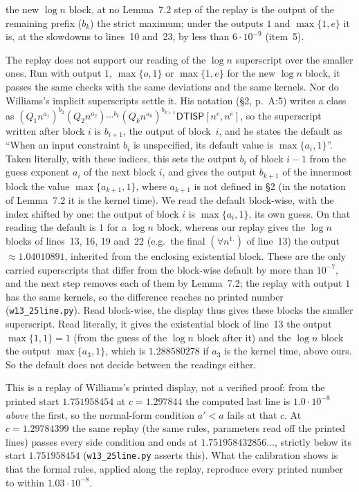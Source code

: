 \documentclass[11pt]{article}
\theoremstyle{definition}
\newcommand{\DTISP}{\mathsf{DTISP}}
\begin{document}
the new $\log n$ block, at no Lemma~7.2 step of the replay is the output of the remaining prefix ($b_k$) the strict maximum; under the outputs $1$ and $\max\{1,e\}$ it is, at the slowdowns to lines~10 and~23, by less than $6\cdot10^{-9}$ (item~5).

The replay does not support our reading of the $\log n$ superscript over the smaller ones. Run with output $1$, $\max\{o,1\}$ or $\max\{1,e\}$ for the new $\log n$ block, it passes the same checks with the same deviations and the same kernels. Nor do Williams's implicit superscripts settle it. His notation (\S2, p.~A:5) writes a class as $(Q_1n^{a_1})^{b_2}(Q_2n^{a_2})\cdots{}^{b_k}(Q_kn^{a_k})^{b_{k+1}}\DTISP[n^c,n^e]$, so the superscript written after block $i$ is $b_{i+1}$, the output of block~$i$, and he states the default as ``When an input constraint $b_i$ is unspecified, its default value is $\max\{a_i,1\}$''. Taken literally, with these indices, this sets the output $b_i$ of block $i-1$ from the guess exponent $a_i$ of the next block $i$, and gives the output $b_{k+1}$ of the innermost block the value $\max\{a_{k+1},1\}$, where $a_{k+1}$ is not defined in \S2 (in the notation of Lemma~7.2 it is the kernel time). We read the default block-wise, with the index shifted by one: the output of block $i$ is $\max\{a_i,1\}$, its own guess. On that reading the default is $1$ for a $\log n$ block, whereas our replay gives the $\log n$ blocks of lines~13, 16, 19 and~22 (e.g.\ the final $(\forall n^{1.})$ of line~13) the output $\approx1.04010891$, inherited from the enclosing existential block. These are the only carried superscripts that differ from the block-wise default by more than $10^{-7}$, and the next step removes each of them by Lemma~7.2; the replay with output $1$ has the same kernels, so the difference reaches no printed number (\texttt{w13\_25line.py}). Read block-wise, the display thus gives these blocks the smaller superscript. Read literally, it gives the existential block of line~13 the output $\max\{1,1\}=1$ (from the guess of the $\log n$ block after it) and the $\log n$ block the output $\max\{a_3,1\}$, which is $1.288580278$ if $a_3$ is the kernel time, above ours. So the default does not decide between the readings either.

This is a replay of Williams's printed display, not a verified proof: from the printed start $1.751958454$ at $c=1.297844$ the computed last line is $1.0\cdot10^{-8}$ \emph{above} the first, so the normal-form condition $a'<a$ fails at that $c$. At $c=1.29784399$ the same replay (the same rules, parameters read off the printed lines) passes every side condition and ends at $1.751958432856\ldots$, strictly below its start $1.751958454$ (\texttt{w13\_25line.py} asserts this). What the calibration shows is that the formal rules, applied along the replay, reproduce every printed number to within $1.03\cdot10^{-8}$.
\end{document}
